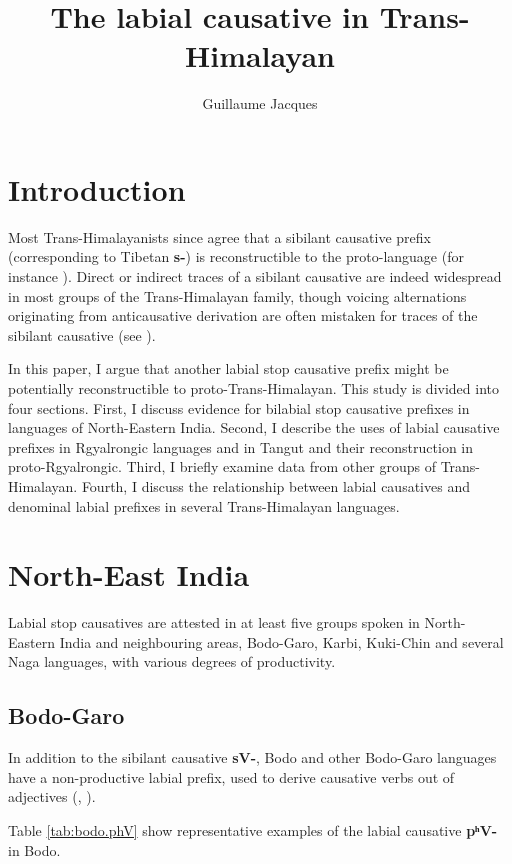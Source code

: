 \documentclass[oneside,a4paper,11pt]{article}
\newcommand{\ipa}[1]{\textbf{{\phon\mbox{#1}}}} %
\begin{document}
\title{The labial causative in Trans-Himalayan}
\author{Guillaume Jacques}
\maketitle
\sloppy


\section{Introduction}
Most Trans-Himalayanists since \citet{conrady1896} agree that a sibilant causative prefix (corresponding to Tibetan \ipa{s-}) is reconstructible to the proto-language (for instance \citealt{wolfenden29outlines, matisoff03}). Direct or indirect traces of a sibilant causative are indeed widespread in most groups of the Trans-Himalayan family, though voicing alternations originating from anticausative derivation are often mistaken for traces of the sibilant causative (see \citealt{jacques15causative}).

In this paper, I argue that another labial stop causative prefix might be potentially reconstructible to proto-Trans-Himalayan. This study is divided into four sections. First,  I discuss evidence for bilabial stop causative prefixes in languages of North-Eastern India. Second, I describe the uses of labial causative prefixes in Rgyalrongic languages and in Tangut and their reconstruction in proto-Rgyalrongic. Third, I briefly examine data from other groups of Trans-Himalayan. Fourth, I discuss the relationship between labial causatives and denominal labial prefixes in several Trans-Himalayan languages.

\section{North-East India}
Labial stop causatives are attested in at least five groups spoken in North-Eastern India and neighbouring areas, Bodo-Garo, Karbi, Kuki-Chin and several Naga languages, with various degrees of productivity.

\subsection{Bodo-Garo}
In addition to the sibilant causative \ipa{sV-}, Bodo and other Bodo-Garo languages have a non-productive labial prefix, used to derive causative verbs out of adjectives (\citealt[90]{mazo04st}, \citealt{delancey15adjectival}).

Table \ref{tab:bodo.phV} show representative examples of the labial causative  \ipa{pʰV-} in Bodo.
\end{document}
